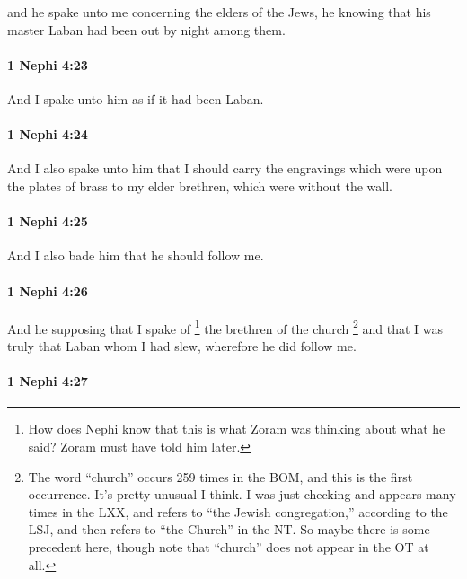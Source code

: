 			and he spake unto me concerning the elders of the Jews,
			he knowing that his master Laban had been out by night among them.

		\paragraph{1 Nephi 4:23} %
			\label{1NEPHI-4-23}

			And I spake unto him as if it had been Laban.

		\paragraph{1 Nephi 4:24} %
			\label{1NEPHI-4-24}

			And I also spake unto him that I should carry the engravings
			which were upon the plates of brass
			to my elder brethren, which were without the wall.

		\paragraph{1 Nephi 4:25} %
			\label{1NEPHI-4-25}

			And I also bade him that he should follow me.

		\paragraph{1 Nephi 4:26} %
			\label{1NEPHI-4-26}

			And he supposing that I spake of%
				\footnote{%
					How does Nephi know that this is what Zoram was thinking about what he said? Zoram must have told him later.
					}
			the brethren of the church%
				\footnote{%
					\label{1NEPHI-4-26-NOTE-church}%
					The word ``church'' occurs 259 times in the BOM, and this is the first occurrence. It's pretty unusual I think. I was just checking and  appears many times in the LXX, and refers to ``the Jewish congregation,'' according to the LSJ, and then refers to ``the Church'' in the NT. So maybe there is some precedent here, though note that ``church'' does not appear in the OT at all.
					}
			and that I was truly that Laban whom I had slew,
			wherefore he did follow me.

		\paragraph{1 Nephi 4:27} %
			\label{1NEPHI-4-27}

